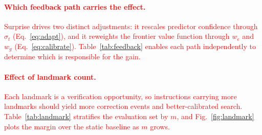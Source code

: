 \textcolor{red}{\paragraph{Which feedback path carries the effect.} Surprise drives two distinct adjustments: it rescales predictor confidence through $\sigma_t$ (Eq.~\ref{eq:adapt}), and it reweights the frontier value function through $w_e$ and $w_g$ (Eq.~\ref{eq:calibrate}). Table~\ref{tab:feedback} enables each path independently to determine which is responsible for the gain.}

\textcolor{red}{\paragraph{Effect of landmark count.} Each landmark is a verification opportunity, so instructions carrying more landmarks should yield more correction events and better-calibrated search. Table~\ref{tab:landmark} stratifies the evaluation set by $m$, and Fig.~\ref{fig:landmark} plots the margin over the static baseline as $m$ grows.}

